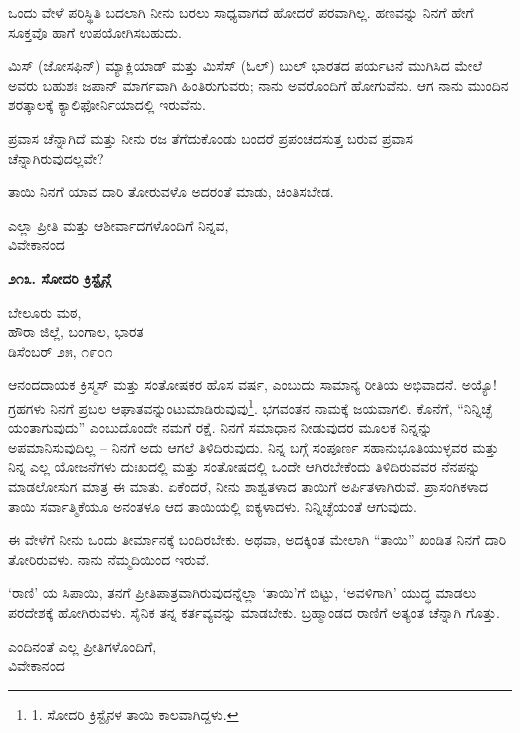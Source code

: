 ಒಂದು ವೇಳೆ ಪರಿಸ್ಥಿತಿ ಬದಲಾಗಿ ನೀನು ಬರಲು ಸಾಧ್ಯವಾಗದೆ ಹೋದರೆ ಪರವಾಗಿಲ್ಲ. ಹಣವನ್ನು ನಿನಗೆ ಹೇಗೆ ಸೂಕ್ತವೊ ಹಾಗೆ ಉಪಯೋಗಿಸಬಹುದು.

ಮಿಸ್ (ಜೋಸಫಿನ್) ಮ್ಯಾಕ್ಲಿಯಾಡ್ ಮತ್ತು ಮಿಸೆಸ್ (ಓಲ್) ಬುಲ್ ಭಾರತದ ಪರ್ಯಟನೆ ಮುಗಿಸಿದ ಮೇಲೆ ಅವರು ಬಹುಶಃ ಜಪಾನ್ ಮಾರ್ಗವಾಗಿ ಹಿಂತಿರುಗುವರು; ನಾನು ಅವರೊಂದಿಗೆ ಹೋಗುವೆನು. ಆಗ ನಾನು ಮುಂದಿನ ಶರತ್ಕಾಲಕ್ಕೆ ಕ್ಯಾಲಿಫೋರ್ನಿಯಾದಲ್ಲಿ ಇರುವೆನು.

ಪ್ರವಾಸ ಚೆನ್ನಾಗಿದೆ ಮತ್ತು ನೀನು ರಜ ತೆಗೆದುಕೊಂಡು ಬಂದರೆ ಪ್ರಪಂಚದಸುತ್ತ ಬರುವ ಪ್ರವಾಸ ಚೆನ್ನಾಗಿರುವುದಲ್ಲವೇ?

ತಾಯಿ ನಿನಗೆ ಯಾವ ದಾರಿ ತೋರುವಳೊ ಅದರಂತೆ ಮಾಡು, ಚಿಂತಿಸಬೇಡ.

\begin{center}
ಎಲ್ಲಾ ಪ್ರೀತಿ ಮತ್ತು ಆಶೀರ್ವಾದಗಳೊಂದಿಗೆ ನಿನ್ನವ,\\ವಿವೇಕಾನಂದ
\end{center}

\begin{center}
\textbf{೨೧೩. ಸೋದರಿ ಕ್ರಿಸ್ಟೈನ್ಗೆ}
\end{center}

\begin{flushright}
ಬೇಲೂರು ಮಠ,\\ಹೌರಾ ಜಿಲ್ಲೆ, ಬಂಗಾಲ, ಭಾರತ\\ಡಿಸೆಂಬರ್ ೨೫, ೧೯೦೧
\end{flushright}

ಆನಂದದಾಯಕ ಕ್ರಿಸ್ಮಸ್ ಮತ್ತು ಸಂತೋಷಕರ ಹೊಸ ವರ್ಷ, ಎಂಬುದು ಸಾಮಾನ್ಯ ರೀತಿಯ ಅಭಿವಾದನೆ. ಅಯ್ಯೊ! ಗ್ರಹಗಳು ನಿನಗೆ ಪ್ರಬಲ ಆಘಾತವನ್ನುಂಟುಮಾಡಿರುವುವು\footnote{1. ಸೋದರಿ ಕ್ರಿಸ್ಟೈನಳ ತಾಯಿ ಕಾಲವಾಗಿದ್ದಳು.}. ಭಗವಂತನ ನಾಮಕ್ಕೆ ಜಯವಾಗಲಿ. ಕೊನೆಗೆ, “ನಿನ್ನಿಚ್ಛೆ ಯಂತಾಗುವುದು” ಎಂಬುದೊಂದೇ ನಮಗೆ ರಕ್ಷೆ. ನಿನಗೆ ಸಮಾಧಾನ ನೀಡುವುದರ ಮೂಲಕ ನಿನ್ನನ್ನು ಅಪಮಾನಿಸುವುದಿಲ್ಲ – ನಿನಗೆ ಅದು ಆಗಲೆ ತಿಳಿದಿರುವುದು. ನಿನ್ನ ಬಗ್ಗೆ ಸಂಪೂರ್ಣ ಸಹಾನುಭೂತಿಯುಳ್ಳವರ ಮತ್ತು ನಿನ್ನ ಎಲ್ಲ ಯೋಜನೆಗಳು ದುಃಖದಲ್ಲಿ ಮತ್ತು ಸಂತೋಷದಲ್ಲಿ ಒಂದೇ ಆಗಿರಬೇಕೆಂದು ತಿಳಿದಿರುವವರ ನೆನಪನ್ನು ಮಾಡಲೋಸುಗ ಮಾತ್ರ ಈ ಮಾತು. ಏಕೆಂದರೆ, ನೀನು ಶಾಶ್ವತಳಾದ ತಾಯಿಗೆ ಅರ್ಪಿತಳಾಗಿರುವೆ. ಪ್ರಾಸಂಗಿಕಳಾದ ತಾಯಿ ಸರ್ವಾತ್ಮಿಕೆಯೂ ಅನಂತಳೂ ಆದ ತಾಯಿಯಲ್ಲಿ ಐಕ್ಯಳಾದಳು. ನಿನ್ನಿಚ್ಛೆಯಂತೆ ಆಗುವುದು.

ಈ ವೇಳೆಗೆ ನೀನು ಒಂದು ತೀರ್ಮಾನಕ್ಕೆ ಬಂದಿರಬೇಕು. ಅಥವಾ, ಅದಕ್ಕಿಂತ ಮೇಲಾಗಿ “ತಾಯಿ” ಖಂಡಿತ ನಿನಗೆ ದಾರಿ ತೋರಿರುವಳು. ನಾನು ನೆಮ್ಮದಿಯಿಂದ ಇರುವೆ.

‘ರಾಣಿ’ ಯ ಸಿಪಾಯಿ, ತನಗೆ ಪ್ರೀತಿಪಾತ್ರವಾಗಿರುವುದನ್ನೆಲ್ಲಾ ‘ತಾಯಿ’ಗೆ ಬಿಟ್ಟು, ‘ಅವಳಿಗಾಗಿ’ ಯುದ್ಧ ಮಾಡಲು ಪರದೇಶಕ್ಕೆ ಹೋಗಿರುವಳು. ಸೈನಿಕ ತನ್ನ ಕರ್ತವ್ಯವನ್ನು ಮಾಡಬೇಕು. ಬ್ರಹ್ಮಾಂಡದ ರಾಣಿಗೆ ಅತ್ಯಂತ ಚೆನ್ನಾಗಿ ಗೊತ್ತು.

\begin{flushright}
ಎಂದಿನಂತೆ ಎಲ್ಲ ಪ್ರೀತಿಗಳೊಂದಿಗೆ,\\ವಿವೇಕಾನಂದ
\end{flushright}

